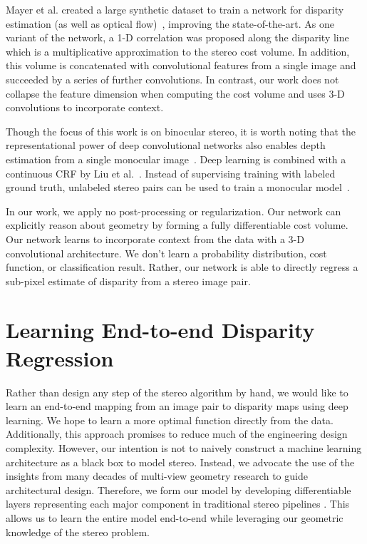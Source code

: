 \documentclass[10pt,twocolumn,letterpaper]{article}
\begin{document}
Mayer et al. created a large synthetic dataset to train a network for disparity estimation (as well as optical flow)~\cite{Mayer2015}, improving the state-of-the-art. As one variant of the network, a 1-D correlation was proposed along the disparity line which is a multiplicative approximation to the stereo cost volume. In addition, this volume is concatenated with convolutional features from a single image and succeeded by a series of further convolutions. In contrast, our work does not collapse the feature dimension when computing the cost volume and uses 3-D convolutions to incorporate context.

Though the focus of this work is on binocular stereo, it is worth noting that the representational power of deep convolutional networks also enables depth estimation from a single monocular image~\cite{Eigen2014a}.  Deep learning is combined with a continuous CRF by Liu et al.~\cite{Liu2015}.  Instead of supervising training with labeled ground truth, unlabeled stereo pairs can be used to train a monocular model~\cite{Garg2016}.

In our work, we apply no post-processing or regularization. Our network can explicitly reason about geometry by forming a fully differentiable cost volume. Our network learns to incorporate context from the data with a 3-D convolutional architecture.  We don't learn a probability distribution, cost function, or classification result.  Rather, our network is able to directly regress a sub-pixel estimate of disparity from a stereo image pair.

\section{Learning End-to-end Disparity Regression}
\label{section:model}

Rather than design any step of the stereo algorithm by hand, we would like to learn an end-to-end mapping from an image pair to disparity maps using deep learning. We hope to learn a more optimal function directly from the data. Additionally, this approach promises to reduce much of the engineering design complexity. However, our intention is not to naively construct a machine learning architecture as a black box to model stereo. Instead, we advocate the use of the insights from many decades of multi-view geometry research \cite{hartley2003multiple} to guide architectural design. Therefore, we form our model by developing differentiable layers representing each major component in traditional stereo pipelines \cite{Scharstein2002}. This allows us to learn the entire model end-to-end while leveraging our geometric knowledge of the stereo problem. 
\end{document}
